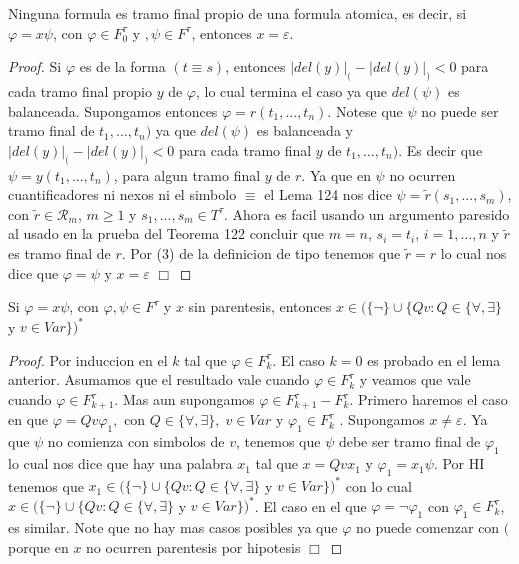   \begin{lemma}
    Ninguna formula es tramo final propio de una formula atomica, es decir, si \( \varphi =x\psi \), con \(\varphi \in F_{0}^{\tau }\) y \(,\psi \in F^{\tau }\), entonces \(x=\varepsilon \).
  \end{lemma}
  \begin{proof}
    Si \(\varphi \) es de la forma \((t\equiv s)\), entonces \(\left\vert del(y)\right\vert _{(}-\left\vert del(y)\right\vert _{)}< 0\) para cada tramo final propio \(y\) de \(\varphi \), lo cual termina el caso ya que \(del(\psi )\) es balanceada. Supongamos entonces \(\varphi =r(t_{1},...,t_{n})\). Notese que \(\psi \) no puede ser tramo final de \(t_{1},...,t_{n})\) ya que \(del(\psi )\) es balanceada y \(\left\vert del(y)\right\vert _{(}-\left\vert del(y)\right\vert _{)}< 0\) para cada tramo final \(y\) de \(t_{1},...,t_{n})\). Es decir que \(\psi =y(t_{1},...,t_{n})\), para algun tramo final \(y\) de \(r\). Ya que en \(\psi \) no ocurren cuantificadores ni nexos ni el simbolo \(\equiv \) el Lema 124 nos dice \(\psi =\tilde{r}(s_{1},...,s_{m})\), con \( \tilde{r}\in \mathcal{R}_{m}\), \(m\geq 1\) y \(s_{1},...,s_{m}\in T^{\tau }\). Ahora es facil usando un argumento paresido al usado en la prueba del Teorema 122 concluir que \(m=n\), \(s_{i}=t_{i}\), \( i=1,...,n\) y \(\tilde{r}\) es tramo final de \(r\). Por (3) de la definicion de tipo tenemos que \(\tilde{r}=r\) lo cual nos dice que \(\varphi =\psi \) y \( x=\varepsilon \) \(\Box\)
  \end{proof}

  \begin{lemma}
    Si \(\varphi =x\psi \), con \(\varphi ,\psi \in F^{\tau }\) y \(x\) sin parentesis, entonces \(x\in (\{\lnot \}\cup \{Qv:Q\in \{\forall ,\exists \}\) y \(v\in Var\})^{\ast }\)
  \end{lemma}
  \begin{proof}
    Por induccion en el \(k\) tal que \(\varphi \in F_{k}^{\tau }\). El caso \(k=0\) es probado en el lema anterior. Asumamos que el resultado vale cuando \( \varphi \in F_{k}^{\tau }\) y veamos que vale cuando \(\varphi \in F_{k+1}^{\tau }\). Mas aun supongamos \(\varphi \in F_{k+1}^{\tau }-F_{k}^{\tau }\). Primero haremos el caso en que \(\varphi =Qv\varphi _{1},\) con \(Q\in \{\forall ,\exists \},\;v\in Var\) y \(\varphi _{1}\in F_{k}^{\tau }\) . Supongamos \(x\neq \varepsilon \). Ya que \(\psi \) no comienza con simbolos de \(v\), tenemos que \(\psi \) debe ser tramo final de \(\varphi _{1}\) lo cual nos dice que hay una palabra \(x_{1}\) tal que \(x=Qvx_{1}\) y \(\varphi _{1}=x_{1}\psi \). Por HI tenemos que \(x_{1}\in (\{\lnot \}\cup \{Qv:Q\in \{\forall ,\exists \}\) y \(v\in Var\})^{\ast }\) con lo cual \(x\in (\{\lnot \}\cup \{Qv:Q\in \{\forall ,\exists \}\) y \(v\in Var\})^{\ast }\). El caso en el que \(\varphi =\lnot \varphi _{1}\) con \(\varphi _{1}\in F_{k}^{\tau }\), es similar. Note que no hay mas casos posibles ya que \(\varphi \) no puede comenzar con \((\) porque en \(x\) no ocurren parentesis por hipotesis \(\Box\)
  \end{proof}

